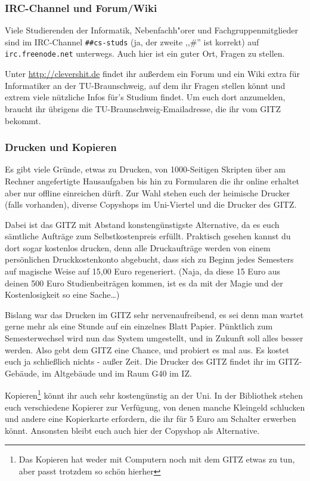 \begin{multicols}{2}
	\subsubsection{IRC-Channel und Forum/Wiki}
		Viele Studierenden der Informatik, Nebenfachh"orer und Fachgruppenmitglieder sind im IRC-Channel \texttt{\#\#cs-studs} (ja, der zweite ,,\#'' ist korrekt) auf \texttt{irc.freenode.net} unterwegs. Auch hier ist ein guter Ort, Fragen zu stellen.

		Unter \url{http://clevershit.de} findet ihr außerdem ein Forum und ein Wiki extra für Informatiker an der TU-Braunschweig, auf dem ihr Fragen stellen könnt und extrem viele nützliche Infos für's Studium findet. Um euch dort anzumelden, braucht ihr übrigens die TU-Braunschweig-Emailadresse, die ihr vom GITZ bekommt.

	\subsubsection{Drucken und Kopieren}
		\label{kopieren}
		Es gibt viele Gründe, etwas zu Drucken, von 1000-Seitigen Skripten über am Rechner angefertigte Hausaufgaben bis hin zu Formularen die ihr online erhaltet aber nur offline einreichen dürft. Zur Wahl stehen euch der heimische Drucker (falls vorhanden), diverse Copyshops im Uni-Viertel und die Drucker des GITZ.

		Dabei ist das GITZ mit Abstand konstengünstigste Alternative, da es euch sämtliche Aufträge zum Selbstkostenpreis erfüllt. Praktisch gesehen kannst du dort sogar kostenlos drucken, denn alle Druckaufträge werden von einem persönlichen Druckkostenkonto abgebucht, dass sich zu Beginn jedes Semesters auf magische Weise auf 15,00 Euro regeneriert. (Naja, da diese 15 Euro aus deinen 500 Euro Studienbeiträgen kommen, ist es da mit der Magie und der Kostenlosigkeit so eine Sache\ldots)

		Bislang war das Drucken im GITZ sehr nervenaufreibend, es sei denn man wartet gerne mehr als eine Stunde auf ein einzelnes Blatt Papier. Pünktlich zum Semesterwechsel wird nun das System umgestellt, und in Zukunft soll alles besser werden. Also gebt dem GITZ eine Chance, und probiert es mal aus. Es kostet euch ja schließlich nichts - außer Zeit. Die Drucker des GITZ findet ihr im GITZ-Gebäude, im Altgebäude und im Raum G40 im IZ.

		Kopieren\footnote{Das Kopieren hat weder mit Computern noch mit dem GITZ etwas zu tun, aber passt trotzdem so schön hierher} könnt ihr auch sehr kostengünstig an der Uni. In der Bibliothek stehen euch verschiedene Kopierer zur Verfügung, von denen manche Kleingeld schlucken und andere eine Kopierkarte erfordern, die ihr für 5 Euro am Schalter erwerben könnt. Ansonsten bleibt euch auch hier der Copyshop als Alternative.


\end{multicols}
